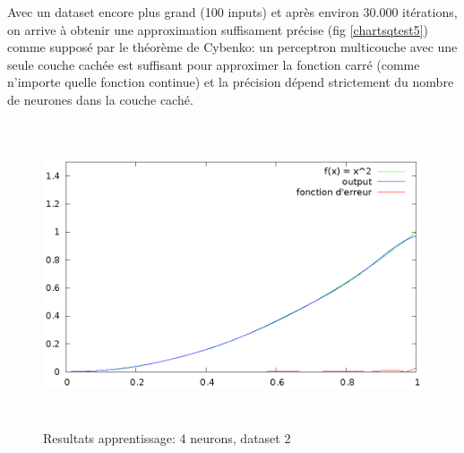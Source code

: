 \documentclass[twoside,openright,a4paper,11pt,french]{article}
\begin{document}
Avec un dataset encore plus grand (100 inputs) et après environ
30.000 itérations, on arrive à obtenir une approximation suffisament
précise (fig \ref{chartsqtest5}) comme supposé par le théorème de Cybenko:
un perceptron multicouche avec une seule couche cachée est suffisant pour
approximer la fonction carré (comme n'importe quelle fonction continue) 
et la précision dépend strictement du nombre de neurones dans la couche caché.

\begin{figure}[ht]
\centering
\includegraphics[width=12cm,height=9cm]{./pics/chartsqtest5.eps}
\caption{Resultats apprentissage: 4 neurons, dataset 2}
\label{fig:chartsqtest5}
\end{figure}


\clearpage
{}


\end{document}
